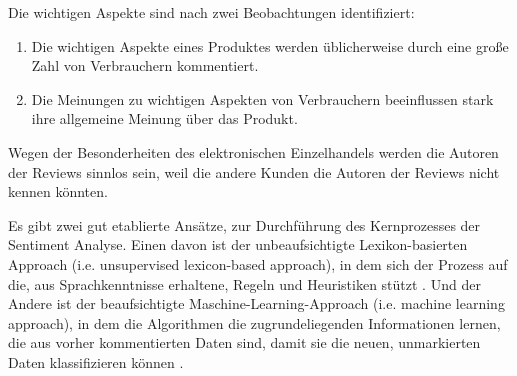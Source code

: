 \begin{description}
Die wichtigen Aspekte sind nach zwei Beobachtungen identifiziert: \citep{Yu2011}
\begin{enumerate}
	\item Die wichtigen Aspekte eines Produktes werden üblicherweise durch eine große Zahl von Verbrauchern kommentiert.
	\item Die Meinungen zu wichtigen Aspekten von Verbrauchern beeinflussen stark ihre allgemeine Meinung über das Produkt.
\end{enumerate}
Wegen der Besonderheiten des elektronischen Einzelhandels werden die Autoren der Reviews sinnlos sein, weil die andere Kunden die Autoren der Reviews nicht kennen könnten.
\end{description}
Es gibt zwei gut etablierte Ansätze, zur Durchführung des Kernprozesses der Sentiment Analyse. Einen davon ist der unbeaufsichtigte Lexikon-basierten Approach (\ac{i.e.} unsupervised lexicon-based approach), in dem sich der Prozess auf die, aus Sprachkenntnisse erhaltene, Regeln und Heuristiken stützt \citep{NLE:9479653}. Und der Andere ist der beaufsichtigte Maschine-Learning-Approach (\ac{i.e.} machine learning approach), in dem die Algorithmen die zugrundeliegenden Informationen lernen, die aus vorher kommentierten Daten sind, damit sie die neuen, unmarkierten Daten klassifizieren können \citep{Pang:2002:TUS:1118693.1118704}.
